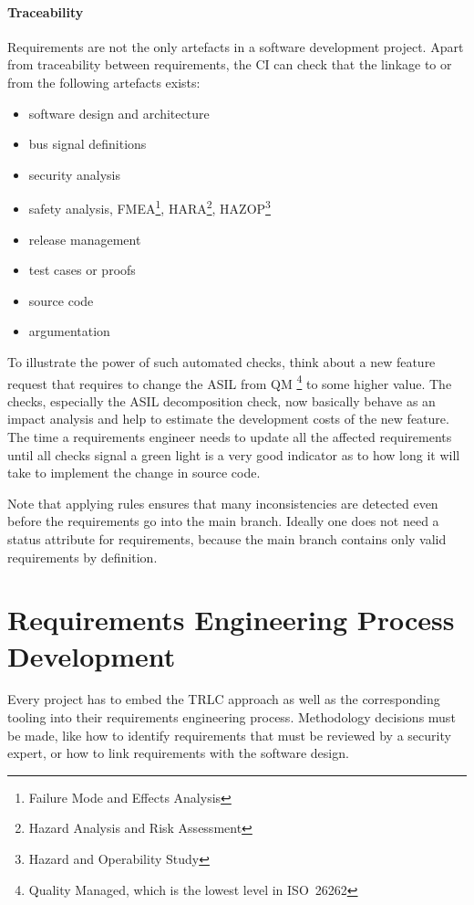 \documentclass[english]{lni}
\begin{document}
\paragraph{Traceability}
Requirements are not the only artefacts in a software development
project.  Apart from traceability between requirements, the CI can
check that the linkage to or from the following artefacts exists:
\begin{itemize}
\item software design and architecture
\item bus signal definitions
\item security analysis
\item safety analysis, FMEA\footnote{Failure Mode and Effects
    Analysis}, HARA\footnote{Hazard Analysis and Risk Assessment},
  HAZOP\footnote{Hazard and Operability Study}
\item release management
\item test cases or proofs
\item source code
\item argumentation
\end{itemize}

To illustrate the power of such automated checks, think about a new
feature request that requires to change the ASIL from QM%
\footnote{Quality Managed, which is the lowest level in ISO~26262} to
some higher value.  The checks, especially the ASIL decomposition
check, now basically behave as an impact analysis and help to estimate
the development costs of the new feature.  The time a requirements
engineer needs to update all the affected requirements until all
checks signal a green light is a very good indicator as to how long it
will take to implement the change in source code.

Note that applying rules ensures that many inconsistencies are
detected even before the requirements go into the main branch.
Ideally one does not need a status attribute for requirements, because
the main branch contains only valid requirements by definition.

\section{Requirements Engineering Process Development}
\label{process}
Every project has to embed the TRLC approach as well as the
corresponding tooling into their requirements engineering process.
Methodology decisions must be made, like how to identify requirements
that must be reviewed by a security expert, or how to link
requirements with the software design.
\end{document}
